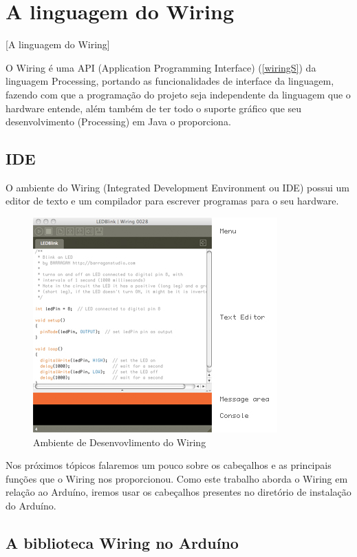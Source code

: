 \chapter{A linguagem do Wiring}[A linguagem do Wiring]

O Wiring é uma API (Application Programming Interface) (\autoref{wiringS}) da linguagem Processing, portando as funcionalidades de interface da linguagem, fazendo com que a programação do projeto seja independente da linguagem que o hardware entende, além também de ter todo o suporte gráfico que seu desenvolvimento (Processing) em Java o proporciona. 

\section{IDE}

O ambiente do Wiring (Integrated Development Environment ou IDE) possui um editor de texto e um compilador para escrever programas para o seu hardware. 

\begin{figure}[htb]
	\caption{\label{wiringIDE}Ambiente de Desenvovlimento do Wiring}
	\begin{center}
	    \includegraphics[scale=0.9]{artigo/refs/ide.jpeg}
	\end{center}
\end{figure}

Nos próximos tópicos falaremos um pouco sobre os cabeçalhos e as principais funções que o Wiring nos proporcionou. Como este trabalho aborda o Wiring em relação ao Arduíno, iremos usar os cabeçalhos presentes no diretório de instalação do Arduíno.

\section{A biblioteca Wiring no Arduíno}

